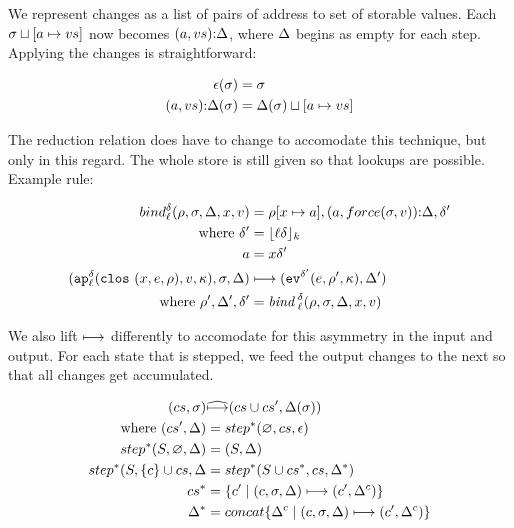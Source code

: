 \documentclass[preprint,onecolumn,9pt]{sigplanconf} %
\begin{document}
We represent changes as a list of pairs of address to set of storable
values. Each $\msto\sqcup[\maddr \mapsto \mval{s}]$ now becomes
$\cons{\ttuple{\maddr}{\mval{s}}}{\msdiff}$, where $\msdiff$ begins as empty for
each step. Applying the changes is straightforward:

\begin{align*}
\mtlst(\msto) &= \msto \\
\cons{\ttuple{\maddr}{\mval{s}}}{\msdiff}(\msto) &= \msdiff(\msto)\sqcup[\maddr \mapsto \mval{s}]
\end{align*}

The reduction relation does have to change to accomodate this
technique, but only in this regard. The whole store is still given so
that lookups are possible. Example rule:

\begin{align*}
bind^{\mcntr}_\mlab(\menv, \msto, \msdiff, \mvar, \mval) &= \menv[\mvar \mapsto \maddr], \cons{\ttuple{\maddr}{force(\msto,\mval)}}{\msdiff}, \mcntr' \\
\text{ where } \mcntr' &= \lfloor \mlab \mcntr\rfloor_k \\
               \maddr &= \mvar\mcntr' \\
(\ap[^\mcntr_\mlab]{\clos{\mvar,\mexp,\menv},\mval,\mkont},\msto,\msdiff) & \machstep
(\ev[^{\mcntr'}]{\mexp,\menv',\mkont},\msdiff') \\
\text{ where }\menv',\msdiff',\mcntr' &= \mathit{bind\,}^{ \mcntr}_\mlab(\menv,\msto,\msdiff,\mvar,\mval)
\end{align*}

We also lift $\machstep$ differently to accomodate for this asymmetry
in the input and output. For each state that is stepped, we feed the
output changes to the next so that all changes get accumulated.

\begin{align*}
(cs, \msto) &\widehat{\machstep} (cs\cup cs', \msdiff(\msto)) \\
\mbox{ where } (cs', \msdiff) &= step^*(\varnothing, cs, \mtlst) \\
step^*(S, \varnothing, \msdiff) &= (S, \msdiff) \\
step^*(S, \{c\}\cup cs, \msdiff &= step^*(S\cup cs^*, cs, \msdiff^*) \\
cs^* &= \{c' \mid (c,\msto,\msdiff) \machstep (c',\msdiff^c) \} \\
\msdiff^* &= concat\{\msdiff^c \mid (c, \msto,\msdiff) \machstep (c', \msdiff^c)\}
\end{align*}
\end{document}
